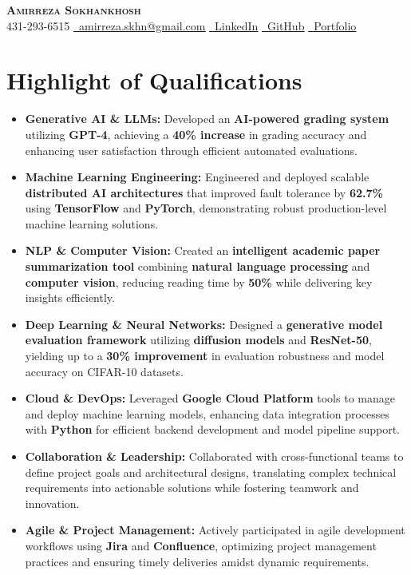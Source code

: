 \documentclass[letterpaper,11pt]{article}
\newcommand{\resumeItem}[1]{
  \item\small{
    #1 \vspace{0pt}
  }
}
\newcommand{\resumeItemListStart}{\begin{itemize}}
\newcommand{\resumeItemListEnd}{\end{itemize}\vspace{-5pt}}
\begin{document}


\begin{center}
    \textbf{\Huge \scshape Amirreza Sokhankhosh} \\ \vspace{1pt}
    \faPhone \small 431-293-6515 \quad
    \href{mailto:amirreza.skhn@gmail.com}{\faEnvelope \ \underline{amirreza.skhn@gmail.com}} \quad
    \href{https://www.linkedin.com/in/amirrezakh/}{\faLinkedin \ \underline{LinkedIn}} \quad
    \href{https://github.com/amirrezaskh}{\faGithub \ \underline{GitHub}} \quad
    \href{https://amirrezaskh.com}{\faBriefcase \ \underline{Portfolio}}
\end{center}

\section{Highlight of Qualifications}
\resumeItemListStart
\resumeItem{\textbf{Generative AI \& LLMs:} Developed an \textbf{AI-powered grading system} utilizing \textbf{GPT-4}, achieving a \textbf{40\% increase} in grading accuracy and enhancing user satisfaction through efficient automated evaluations.}
\resumeItem{\textbf{Machine Learning Engineering:} Engineered and deployed scalable \textbf{distributed AI architectures} that improved fault tolerance by \textbf{62.7\%} using \textbf{TensorFlow} and \textbf{PyTorch}, demonstrating robust production-level machine learning solutions.}
\resumeItem{\textbf{NLP \& Computer Vision:} Created an \textbf{intelligent academic paper summarization tool} combining \textbf{natural language processing} and \textbf{computer vision}, reducing reading time by \textbf{50\%} while delivering key insights efficiently.}
\resumeItem{\textbf{Deep Learning \& Neural Networks:} Designed a \textbf{generative model evaluation framework} utilizing \textbf{diffusion models} and \textbf{ResNet-50}, yielding up to a \textbf{30\% improvement} in evaluation robustness and model accuracy on CIFAR-10 datasets.}
\resumeItem{\textbf{Cloud \& DevOps:} Leveraged \textbf{Google Cloud Platform} tools to manage and deploy machine learning models, enhancing data integration processes with \textbf{Python} for efficient backend development and model pipeline support.}
\resumeItem{\textbf{Collaboration \& Leadership:} Collaborated with cross-functional teams to define project goals and architectural designs, translating complex technical requirements into actionable solutions while fostering teamwork and innovation.}
\resumeItem{\textbf{Agile \& Project Management:} Actively participated in agile development workflows using \textbf{Jira} and \textbf{Confluence}, optimizing project management practices and ensuring timely deliveries amidst dynamic requirements.}
\resumeItemListEnd
\end{document}
